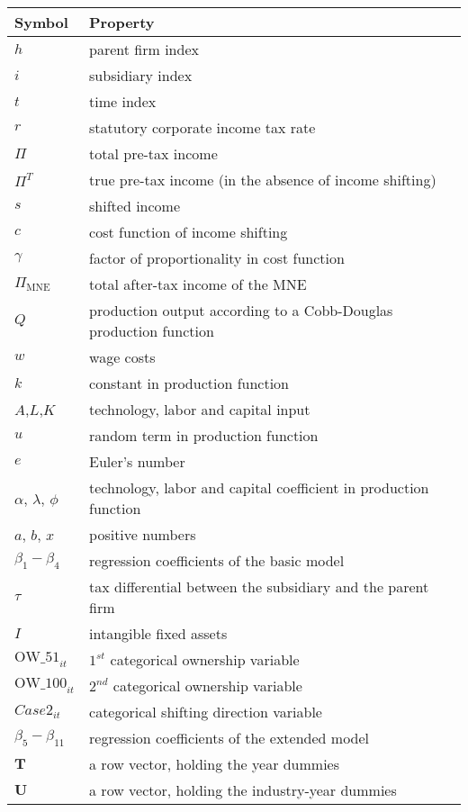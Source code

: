 \documentclass[10pt,twocolumn,oneside,cmyk]{article}
\begin{document}
\begin{center}
 \begin{tabular}{l l}
  \toprule
  Symbol &Property \\
  \midrule
  $h$ &parent firm index\\
  $i$ &subsidiary index \\
  $t$ &time index \\
  $r$ &statutory corporate income tax rate \\
  $\Pi$ &total pre-tax income \\
  $\Pi^T$ &true pre-tax income (in the absence of income shifting) \\
  $s$ &shifted income \\
  $c$ &cost function of income shifting \\
  $\gamma$ &factor of proportionality in cost function \\
  $\Pi_{\text{MNE}}$ &total after-tax income of the MNE \\
  $Q$ &production output according to a Cobb-Douglas production function \\
  $w$ &wage costs \\
  $k$ &constant in production function \\
  $A$,$L$,$K$ & technology, labor and capital input\\
  $u$ &random term in production function \\
  $e$ &Euler's number \\
  $\alpha$, $\lambda$, $\phi$ &technology, labor and capital coefficient in production function \\
  $a$, $b$, $x$ &positive numbers \\
  $\beta_1-\beta_4$ &regression coefficients of the basic model \\
  $\tau$ &tax differential between the subsidiary and the parent firm \\
  $I$ &intangible fixed assets \\
  $\text{OW\_51}_{it}$ &$1^{st}$ categorical ownership variable \\
  $\text{OW\_100}_{it}$ &$2^{nd}$ categorical ownership variable \\
  $Case2_{it}$ &categorical shifting direction variable \\
  $\beta_5-\beta_{11}$ &regression coefficients of the extended model \\
  $\bm{T}$ &a row vector, holding the year dummies \\
  $\bm{U}$ &a row vector, holding the industry-year dummies \\

\end{tabular}
\end{center}
\end{document}
